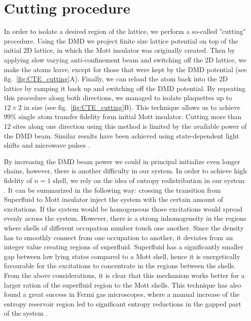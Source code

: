 \section{Cutting procedure}

In order to isolate a desired region of the lattice, we perform a so-called "cutting" procedure. Using the DMD we project finite size lattice potential on top of the initial $2\mathrm{D}$ lattice, in which the Mott insulator was originally created. Then by applying slow varying anti-confinement beam and switching off the $2\mathrm{D}$ lattice, we make the atoms leave, except for those that were kept by the DMD potential (see fig.~\ref{fig:CTE_cutting}A). Finally, we can reload the atom back into the $2\mathrm{D}$ lattice by ramping it back up and switching off the DMD potential. By repeating this procedure along both directions, we managed to isolate plaquettes up to $12\times2$ in size (see fig.~\ref{fig:CTE_cutting}B). This technique allows us to achieve $99\%$ single atom transfer fidelity form initial Mott insulator. Cutting more than $12$ sites along one direction using this method is limited by the available power of the DMD beam. Similar results have been achieved using state-dependent light shifts and microwave pulses \cite{Bloch single site addresing}.

By increasing the DMD beam power we could in principal initialize even longer chains, however, there is another difficulty in our system. In order to achieve high fidelity of $n=1$ shell, we rely on the idea of entropy redistribution in our system \cite{some entropy redistribution}. It can be summarized in the following way: crossing the transition from Superfluid to Mott insulator inject the system with the certain amount of excitations. If the system would be homogeneous those excitations would spread evenly across the system. However, there is a strong inhomogeneity in the regions where shells of different occupation number touch one another. Since the density has to smoothly connect from one occupation to another, it deviates from an integer value creating regions of superfluid. Superfluid has a significantly smaller gap between law lying states compared to a Mott shell, hence it is energetically favourable for the excitations to concentrate in the regions between the shells. From the above considerations, it is clear that this mechanism works better for a larger ration of the superfluid region to the Mott shells. This technique has also found a great success in Fermi gas microscopes, where a manual increase of the entropy reservoir region led to significant entropy reductions in the gapped part of the system \cite{Mazurenko2017, Chiu2018}.

